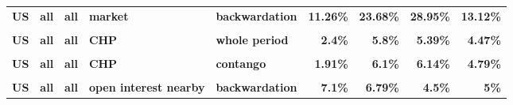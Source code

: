 \documentclass[
  authoryear,
  preprint,
  3p]{elsarticle}
\begin{document}
\begin{landscape}
\begin{longtable}[t]{>{}l>{}l>{}l>{}l>{}l>{}r>{}r>{}r>{}r}
\textbf{US} & \textbf{all} & \textbf{all} & \textbf{market} & \textbf{backwardation} & \textcolor[HTML]{4285f4}{\textbf{11.26\%}} & \textcolor[HTML]{4285f4}{\textbf{23.68\%}} & \textcolor[HTML]{4285f4}{\textbf{28.95\%}} & \textcolor[HTML]{4285f4}{\textbf{13.12\%}}\\
\textbf{\cellcolor{gray!10}{US}} & \textbf{\cellcolor{gray!10}{all}} & \textbf{\cellcolor{gray!10}{all}} & \textbf{\cellcolor{gray!10}{market}} & \textbf{\cellcolor{gray!10}{contango}} & \textcolor[HTML]{4285f4}{\textbf{\cellcolor{gray!10}{12.22\%}}} & \textcolor[HTML]{4285f4}{\textbf{\cellcolor{gray!10}{19.97\%}}} & \textcolor[HTML]{4285f4}{\textbf{\cellcolor{gray!10}{32.48\%}}} & \textcolor[HTML]{4285f4}{\textbf{\cellcolor{gray!10}{17.66\%}}}\\
\addlinespace
\textbf{US} & \textbf{all} & \textbf{all} & \textbf{CHP} & \textbf{whole period} & \textcolor[HTML]{4285f4}{\textbf{2.4\%}} & \textcolor[HTML]{4285f4}{\textbf{5.8\%}} & \textcolor[HTML]{4285f4}{\textbf{5.39\%}} & \textcolor[HTML]{4285f4}{\textbf{4.47\%}}\\
\textbf{\cellcolor{gray!10}{US}} & \textbf{\cellcolor{gray!10}{all}} & \textbf{\cellcolor{gray!10}{all}} & \textbf{\cellcolor{gray!10}{CHP}} & \textbf{\cellcolor{gray!10}{backwardation}} & \textcolor[HTML]{4285f4}{\textbf{\cellcolor{gray!10}{3.19\%}}} & \textcolor[HTML]{4285f4}{\textbf{\cellcolor{gray!10}{5.94\%}}} & \textcolor[HTML]{4285f4}{\textbf{\cellcolor{gray!10}{4.72\%}}} & \textcolor[HTML]{4285f4}{\textbf{\cellcolor{gray!10}{5.54\%}}}\\
\textbf{US} & \textbf{all} & \textbf{all} & \textbf{CHP} & \textbf{contango} & \textcolor[HTML]{4285f4}{\textbf{1.91\%}} & \textcolor[HTML]{4285f4}{\textbf{6.1\%}} & \textcolor[HTML]{4285f4}{\textbf{6.14\%}} & \textcolor[HTML]{4285f4}{\textbf{4.79\%}}\\
\textbf{\cellcolor{gray!10}{US}} & \textbf{\cellcolor{gray!10}{all}} & \textbf{\cellcolor{gray!10}{all}} & \textbf{\cellcolor{gray!10}{open interest nearby}} & \textbf{\cellcolor{gray!10}{whole period}} & \textcolor[HTML]{4285f4}{\textbf{\cellcolor{gray!10}{7.45\%}}} & \textcolor[HTML]{4285f4}{\textbf{\cellcolor{gray!10}{6.95\%}}} & \textcolor[HTML]{4285f4}{\textbf{\cellcolor{gray!10}{4.57\%}}} & \textcolor[HTML]{4285f4}{\textbf{\cellcolor{gray!10}{5.29\%}}}\\
\textbf{US} & \textbf{all} & \textbf{all} & \textbf{open interest nearby} & \textbf{backwardation} & \textcolor[HTML]{4285f4}{\textbf{7.1\%}} & \textcolor[HTML]{4285f4}{\textbf{6.79\%}} & \textcolor[HTML]{4285f4}{\textbf{4.5\%}} & \textcolor[HTML]{4285f4}{\textbf{5\%}}\\

\end{longtable}
\end{landscape}
\end{document}
